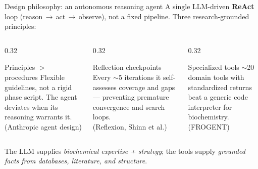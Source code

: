 \documentclass[aspectratio=169, 11pt]{beamer}
\begin{document}
\begin{frame}{Design philosophy: an autonomous reasoning agent}
  A single LLM-driven \textbf{ReAct} loop (reason\,$\rightarrow$\,act\,$\rightarrow$\,observe),
  not a fixed pipeline. Three research-grounded principles:
  \vfill
  \begin{columns}[T]
    \begin{column}{0.32\textwidth}
      \begin{block}{Principles $>$ procedures}
        \footnotesize Flexible guidelines, not a rigid phase script. The agent
        deviates when its reasoning warrants it. \\ {\tiny(Anthropic agent design)}
      \end{block}
    \end{column}
    \begin{column}{0.32\textwidth}
      \begin{block}{Reflection checkpoints}
        \footnotesize Every $\sim$5 iterations it self-assesses coverage and gaps ---
        preventing premature convergence and search loops. \\ {\tiny(Reflexion, Shinn et al.)}
      \end{block}
    \end{column}
    \begin{column}{0.32\textwidth}
      \begin{block}{Specialized tools}
        \footnotesize $\sim$20 domain tools with standardized returns beat a generic
        code interpreter for biochemistry. \\ {\tiny(FROGENT)}
      \end{block}
    \end{column}
  \end{columns}
  \vfill
  \begin{center}\small\color{deepblue}
  The LLM supplies \emph{biochemical expertise + strategy}; the tools supply
  \emph{grounded facts from databases, literature, and structure}.
  \end{center}
\end{frame}
\end{document}

